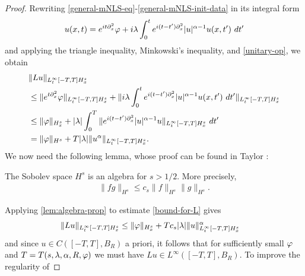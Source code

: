 \begin{proof}
Rewriting \eqref{general-mNLS-eq}-\eqref{general-mNLS-init-data} in its 
integral form
%
%
\begin{equation}
  \label{mNLS-int-form-with-op}
  \begin{split}
    u(x,t) = e^{it \partial_x^2} \varphi + i \lambda \int_0^t e^{i(t - 
    t')\partial_x^2} |u|^{\alpha -1} u(x, t') \ dt' 
  \end{split}
\end{equation}
%
%
and applying the triangle inequality, Minkowski's inequality, and 
\eqref{unitary-op}, we obtain
%
%
\begin{equation}
  \label{bound-for-L}
  \begin{split}
    & \|Lu\|_{L^\infty_t[-T, T] H^s_x}
    \\
    & \le \|e^{t \p_x^2}
    \vp\|_{L^\infty_t[-T, T] H^s_x} + \|i \lambda \int_0^t e^{i(t - 
    t')\p_x^2} |u|^{\alpha -1} u(x, t') \ dt' \|_{L^\infty_t[-T, T] 
    H^s_x} 
    \\
    & \le \|\vp\|_{H^s_x} + |\lambda| \int_0^T \|e^{i(t 
    -t')\p_x^2} |u|^{\alpha -1} u \|_{L^\infty_t[-T, T] H^s_x} \ 
    dt'
    \\
    & = \|\vp\|_{H^s} + T |\lambda| \|u^\alpha \|_{L^\infty_t[-T, T] H^s_x}.
  \end{split}
\end{equation}
%
%
We now need the following lemma, whose proof can be found in Taylor 
\cite{Taylor:1991eg}:
%
%
%
\begin{lemma}
  \label{lem:algebra-prop}
  The Sobolev space $H^s$ is an algebra for $s>1/2$. More precisely, 
%
%
\begin{equation}
  \label{algebra-prop}
  \begin{split}
    \|fg\|_{H^s} \le c_s \|f\|_{H^s} \|g\|_{H^s}.
  \end{split}
\end{equation}
%
%
%
\end{lemma}
%
%
Applying \cref{lem:algebra-prop} to estimate \eqref{bound-for-L} gives
%
%
%
%
\begin{equation}
  \label{Tu-space-bound}
  \begin{split}
    \|Lu\|_{L^\infty_t[-T, T] H^s_x}
    & \le \|\varphi\|_{H^s_x} + Tc_s | \lambda| \|u\|_{L^\infty_t[-T, T] 
    H^s_x}^\alpha
  \end{split}
\end{equation}
%
%
and since $u \in C([-T, T], B_R)$ a priori, it follows
that for sufficiently small $\varphi$ and $T = T(s, \lambda, \alpha, R, \varphi)$ we must 
have $Lu \in L^\infty([-T, T], B_R)$. To improve the regularity of 

\end{proof}
